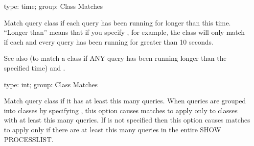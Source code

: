 \documentclass[letterpaper,10pt,english]{sphinxmanual}
\begin{document}
\begin{fulllineitems}
\label{\detokenize{mariadb-kill:cmdoption-mariadb-kill-each-busy-time}}
\sphinxAtStartPar
type: time; group: Class Matches

\sphinxAtStartPar
Match query class if each query has been running for longer than this time.
“Longer than” means that if you specify , for example, the class will
only match if each and every query has been running for greater than 10
seconds.

\sphinxAtStartPar
See also {\hyperref[\detokenize{mariadb-kill:cmdoption-mariadb-kill-any-busy-time}]{}} (to match a class if ANY query has been running
longer than the specified time) and {\hyperref[\detokenize{mariadb-kill:cmdoption-mariadb-kill-busy-time}]{}}.

\end{fulllineitems}


\begin{fulllineitems}
\label{\detokenize{mariadb-kill:cmdoption-mariadb-kill-query-count}}
\sphinxAtStartPar
type: int; group: Class Matches

\sphinxAtStartPar
Match query class if it has at least this many queries.  When queries are
grouped into classes by specifying {\hyperref[\detokenize{mariadb-kill:cmdoption-mariadb-kill-group-by}]{}}, this option causes matches
to apply only to classes with at least this many queries.  If {\hyperref[\detokenize{mariadb-kill:cmdoption-mariadb-kill-group-by}]{}}
is not specified then this option causes matches to apply only if there
are at least this many queries in the entire SHOW PROCESSLIST.

\end{fulllineitems}
\end{document}
